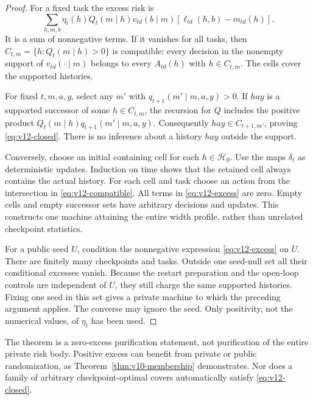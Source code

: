 \begin{proof}
For a fixed task the excess risk is
\begin{equation}
 \sum_{h,m,b}\eta_t(h)Q_t(m\mid h)v_{td}(b\mid m)
           [\ell_{td}(h,b)-m_{td}(h)].
 \label{eq:v12-excess}
\end{equation}
It is a sum of nonnegative terms. If it vanishes for all tasks, then
$C_{t,m}=\{h:Q_t(m\mid h)>0\}$ is compatible: every decision in the
nonempty support of $v_{td}(\cdot\mid m)$ belongs to every $A_{td}(h)$
with $h\in C_{t,m}$. The cells cover the supported histories.

For fixed $t,m,a,y$, select any $m'$ with
$q_{t+1}(m'\mid m,a,y)>0$. If $hay$ is a supported successor of some
$h\in C_{t,m}$, the recursion for $Q$ includes the positive product
$Q_t(m\mid h)q_{t+1}(m'\mid m,a,y)$. Consequently
$hay\in C_{t+1,m'}$, proving \eqref{eq:v12-closed}. There is no inference
about a history $hay$ outside the support.

Conversely, choose an initial containing cell for each $h\in\mathcal H_0$.
Use the maps $\delta_t$ as deterministic updates. Induction on time shows
that the retained cell always contains the actual history. For each cell
and task choose an action from the intersection in
\eqref{eq:v12-compatible}. All terms in \eqref{eq:v12-excess} are zero.
Empty cells and empty successor sets have arbitrary decisions and updates.
This constructs one machine attaining the entire width profile, rather
than unrelated checkpoint statistics.

For a public seed $U$, condition the nonnegative expression
\eqref{eq:v12-excess} on $U$. There are finitely many checkpoints and tasks.
Outside one seed-null set all their conditional excesses vanish. Because
the restart preparation and the open-loop controls are independent of
$U$, they still charge the same supported histories. Fixing one seed in
this set gives a private machine to which the preceding argument applies.
The converse may ignore the seed. Only positivity, not the numerical
values, of $\eta_t$ has been used.
\end{proof}

The theorem is a zero-excess purification statement, not purification of
the entire private risk body. Positive excess can benefit from private or
public randomization, as Theorem~\ref{thm:v10-membership} demonstrates.
Nor does a family of arbitrary checkpoint-optimal covers automatically
satisfy \eqref{eq:v12-closed}.

